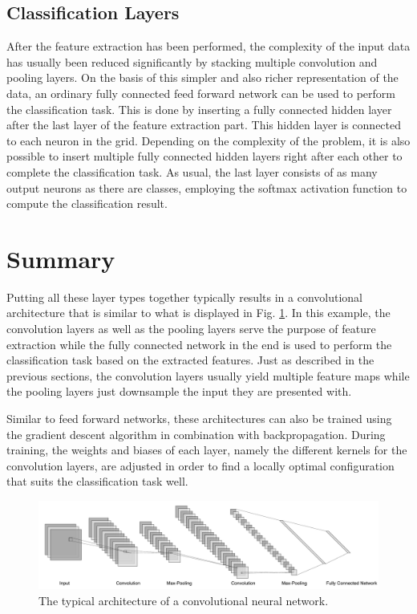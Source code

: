 \subsection{Classification Layers}

After the feature extraction has been performed, the complexity of the
input data has usually been reduced significantly by stacking multiple
convolution and pooling layers. On the basis of this simpler and also
richer representation of the data, an ordinary fully connected feed
forward network can be used to perform the classification task. This
is done by inserting a fully connected hidden layer after the last
layer of the feature extraction part. This hidden layer is connected
to each neuron in the grid. Depending on the complexity of the
problem, it is also possible to insert multiple fully connected hidden
layers right after each other to complete the classification task. As
usual, the last layer consists of as many output neurons as there are
classes, employing the softmax activation function to compute the
classification result.

\section{Summary}

Putting all these layer types together typically results in a
convolutional architecture that is similar to what is displayed in
Fig. \ref{fig:convnet}. In this example, the convolution layers as
well as the pooling layers serve the purpose of feature extraction
while the fully connected network in the end is used to perform the
classification task based on the extracted features. Just as described
in the previous sections, the convolution layers usually yield
multiple feature maps while the pooling layers just downsample the
input they are presented with.

Similar to feed forward networks, these architectures can also be
trained using the gradient descent algorithm in combination with
backpropagation. During training, the weights and biases of each
layer, namely the different kernels for the convolution layers, are
adjusted in order to find a locally optimal configuration that suits
the classification task well.
\begin{figure}[h]
  \centering
  \includegraphics[width=\textwidth]{../figures/convnet}
  \caption{The typical architecture of a convolutional neural
    network.}
  \label{fig:convnet}
\end{figure}
